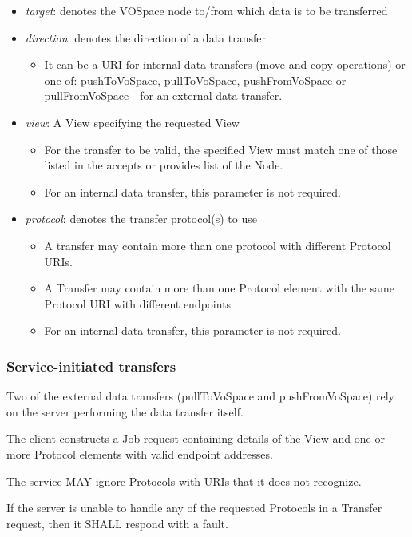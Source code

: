 \documentclass[11pt,a4paper]{ivoa}
\begin{document}
\begin{itemize}
    \item \emph{target}: denotes the VOSpace node to/from which data is to be transferred
    \item \emph{direction}: denotes the direction of a data transfer
        \begin{itemize}
            \item It can be a URI for internal data transfers (move and copy operations) or one of: pushToVoSpace, pullToVoSpace, pushFromVoSpace or pullFromVoSpace - for an external data transfer.
        \end{itemize}
    \item \emph{view}: A View specifying the requested View
        \begin{itemize}
            \item For the transfer to be valid, the specified View must match one of those listed in the accepts or provides list of the Node.
            \item For an internal data transfer, this parameter is not required.
        \end{itemize}
    \item \emph{protocol}: denotes the transfer protocol(s) to use
        \begin{itemize}
            \item A transfer may contain more than one protocol with different Protocol URIs.
            \item A Transfer may contain more than one Protocol element with the same Protocol URI with different endpoints
            \item For an internal data transfer, this parameter is not required.
        \end{itemize}
\end{itemize}

\subsubsection{Service-initiated transfers}
Two of the external data transfers (pullToVoSpace and pushFromVoSpace) rely on the server performing the data transfer itself.

The client constructs a Job request containing details of the View and one or more Protocol elements with valid endpoint addresses.

The service MAY ignore Protocols with URIs that it does not recognize.

If the server is unable to handle any of the requested Protocols in a Transfer request, then it SHALL respond with a fault.
\end{document}
